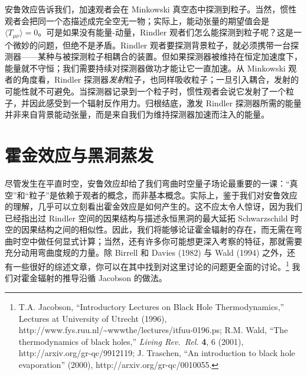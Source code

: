安鲁效应告诉我们，加速观者会在 Minkowski 真空态中探测到粒子。当然，惯性观者会把同一个态描述成完全空无一物；实际上，能动张量的期望值会是 $\langle T_{\mu\nu}\rangle=0$。可是如果没有能量-动量，Rindler 观者们怎么能探测到粒子呢？这是一个微妙的问题，但绝不是矛盾。Rindler 观者要探测背景粒子，就必须携带一台探测器——某种与被探测粒子相耦合的装置。但如果探测器被维持在恒定加速度下，能量就不守恒；我们需要持续对探测器做功才能让它一直加速。从 Minkowski 观者的角度看，Rindler 探测器\emph{发射}粒子，也同样吸收粒子；一旦引入耦合，发射的可能性就不可避免。当探测器记录到一个粒子时，惯性观者会说它发射了一个粒子，并因此感受到一个辐射反作用力。归根结底，激发 Rindler 探测器所需的能量并非来自背景能动张量，而是来自我们为维持探测器加速而注入的能量。

\section{霍金效应与黑洞蒸发}

尽管发生在平直时空，安鲁效应却给了我们弯曲时空量子场论最重要的一课：“真空”和“粒子”是依赖于观者的概念，而非基本概念。实际上，鉴于我们对安鲁效应的理解，几乎可以立刻看出霍金效应是如何产生的。这不应太令人惊讶，因为我们已经指出过 Rindler 空间的因果结构与描述永恒黑洞的最大延拓 Schwarzschild 时空的因果结构之间的相似性。因此，我们将能够论证霍金辐射的存在，而无需在弯曲时空中做任何显式计算；当然，还有许多你可能想更深入考察的特征，那就需要充分动用弯曲度规的力量。除 Birrell 和 Davies (1982) 与 Wald (1994) 之外，还有一些很好的综述文章，你可以在其中找到对这里讨论的问题更全面的讨论。\footnote{T.A. Jacobson, “Introductory Lectures on Black Hole Thermodynamics,” Lectures at University of Utrecht (1996), http://www.fys.ruu.nl/\textasciitilde{}wwwthe/lectures/itfuu-0196.ps; R.M. Wald, “The thermodynamics of black holes,” \emph{Living Rev.\ Rel.} \textbf{4}, 6 (2001), http://arxiv.org/gr-qc/9912119; J. Traschen, “An introduction to black hole evaporation” (2000), http://arxiv.org/gr-qc/0010055.} 我们对霍金辐射的推导沿循 Jacobson 的做法。
